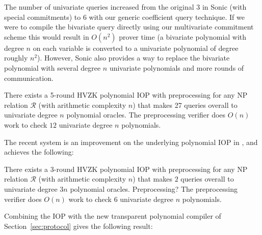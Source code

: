 The number of univariate queries increased from the original $3$ in \textsf{Sonic} (with special commitments) to $6$ with our generic coefficient query technique. 
If we were to compile the bivariate query directly using our multivariate commitment scheme this would result in $O(n^2)$ prover time (a bivariate polynomial with degree $n$ on each variable is converted to a univariate polynomial of degree roughly $n^2$). However, \textsf{Sonic} also provides a way to replace the bivariate polynomial with several degree $n$ univariate polynomials and more rounds of communication. 

\begin{theorem}\label{thm:sonic} 
There exists a 5-round HVZK polynomial IOP with preprocessing for any NP relation $\mathcal{R}$ (with arithmetic complexity $n$) that makes 27 queries overall to univariate degree $n$ polynomial oracles. The preprocessing verifier does $O(n)$ work to check $12$ univariate degree $n$ polynomials. 
\end{theorem}

The recent system  is an improvement on the underlying polynomial IOP in , and achieves the following: 

\begin{theorem} 
There exists a 3-round HVZK polynomial IOP with preprocessing for any NP relation $\mathcal{R}$ (with arithmetic complexity $n$) that makes $2$ queries overall to univariate degree $3n$ polynomial oracles. Preprocessing? The preprocessing verifier does $O(n)$ work to check $6$ univariate degree $n$ polynomials.
\end{theorem}

Combining the  IOP with the new transparent polynomial compiler of Section~\ref{sec:protocol} gives the following result:  

